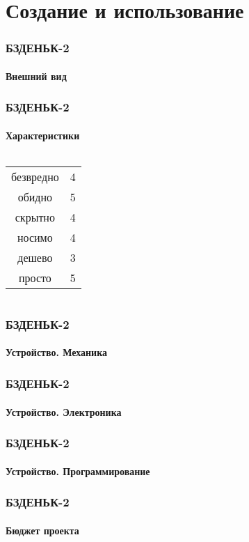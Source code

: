 \section{Создание и использование}

\begin{frame}
    \frametitle{БЗДЕНЬК-2}
    \framesubtitle{Внешний вид}
    
\end{frame}

\begin{frame}
    \frametitle{БЗДЕНЬК-2}
    \framesubtitle{Характеристики}
    
    \begin{columns}
            \begin{center}
                \begin{tabular}{c|c}
                    \hline
                    безвредно        & 4 \\
                    обидно           & 5 \\
                    скрытно          & 4 \\
                    носимо           & 4 \\
                    дешево           & 3 \\
                    просто           & 5 \\ \hline
                \end{tabular}
            \end{center}
    \end{columns}    
\end{frame}

\begin{frame}
    \frametitle{БЗДЕНЬК-2}
    \framesubtitle{Устройство. Механика}
\end{frame}

\begin{frame}
    \frametitle{БЗДЕНЬК-2}
    \framesubtitle{Устройство. Электроника}
\end{frame}

\begin{frame}
    \frametitle{БЗДЕНЬК-2}
    \framesubtitle{Устройство. Программирование}
\end{frame}

\begin{frame}
    \frametitle{БЗДЕНЬК-2}
    \framesubtitle{Бюджет проекта}
\end{frame}

